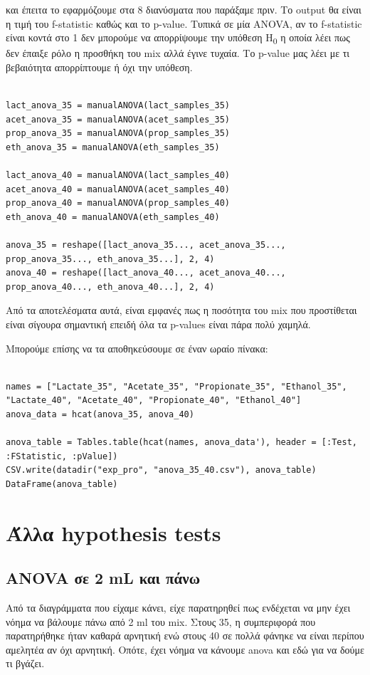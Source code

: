 \documentclass[11pt]{article}
\begin{document}
και έπειτα το εφαρμόζουμε στα 8 διανύσματα που παράξαμε πριν. Το output θα είναι η τιμή του f-statistic καθώς και το p-value. Τυπικά σε μία ANOVA, αν το f-statistic είναι κοντά στο 1 δεν μπορούμε να απορρίψουμε την υπόθεση H\textsubscript{0} η οποία λέει πως δεν έπαιξε ρόλο η προσθήκη του mix αλλά έγινε τυχαία. Το p-value μας λέει με τι βεβαιότητα απορρίπτουμε ή όχι την υπόθεση.

\begin{verbatim}

lact_anova_35 = manualANOVA(lact_samples_35)
acet_anova_35 = manualANOVA(acet_samples_35)
prop_anova_35 = manualANOVA(prop_samples_35)
eth_anova_35 = manualANOVA(eth_samples_35)

lact_anova_40 = manualANOVA(lact_samples_40)
acet_anova_40 = manualANOVA(acet_samples_40)
prop_anova_40 = manualANOVA(prop_samples_40)
eth_anova_40 = manualANOVA(eth_samples_40)

anova_35 = reshape([lact_anova_35..., acet_anova_35..., prop_anova_35..., eth_anova_35...], 2, 4)
anova_40 = reshape([lact_anova_40..., acet_anova_40..., prop_anova_40..., eth_anova_40...], 2, 4)

\end{verbatim}

Από τα αποτελέσματα αυτά, είναι εμφανές πως η ποσότητα του mix που προστίθεται είναι σίγουρα σημαντική επειδή όλα τα p-values είναι πάρα πολύ χαμηλά.

Μπορούμε επίσης να τα αποθηκεύσουμε σε έναν ωραίο πίνακα:

\begin{verbatim}

names = ["Lactate_35", "Acetate_35", "Propionate_35", "Ethanol_35", "Lactate_40", "Acetate_40", "Propionate_40", "Ethanol_40"]
anova_data = hcat(anova_35, anova_40)

anova_table = Tables.table(hcat(names, anova_data'), header = [:Test, :FStatistic, :pValue])
CSV.write(datadir("exp_pro", "anova_35_40.csv"), anova_table)
DataFrame(anova_table)

\end{verbatim}

\section{Άλλα hypothesis tests}
\label{sec:org0863aa8}
\subsection{ANOVA σε 2 mL και πάνω}
\label{sec:org15c4b19}
Από τα διαγράμματα που είχαμε κάνει, είχε παρατηρηθεί πως ενδέχεται να μην έχει νόημα να βάλουμε πάνω από 2 ml του mix. Στους 35, η συμπεριφορά που παρατηρήθηκε ήταν καθαρά αρνητική ενώ στους 40 σε πολλά φάνηκε να είναι περίπου αμελητέα αν όχι αρνητική. Οπότε, έχει νόημα να κάνουμε anova και εδώ για να δούμε τι βγάζει.
\end{document}
